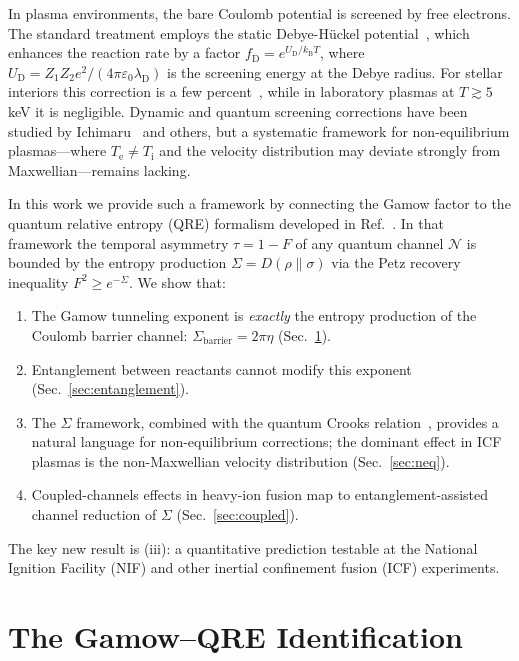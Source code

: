 \documentclass[prc,twocolumn,superscriptaddress,longbibliography,floatfix]{revtex4-2}
\newcommand{\kB}{k_{\mathrm{B}}}
\newcommand{\chan}{\mathcal{N}}
\newcommand{\tauasym}{\tau}
\newcommand{\Sbar}{\Sigma_{\mathrm{barrier}}}
\newcommand{\lD}{\lambda_{\mathrm{D}}}
\newcommand{\UD}{U_{\mathrm{D}}}
\newcommand{\fD}{f_{\mathrm{D}}}
\newcommand{\Te}{T_{\mathrm{e}}}
\newcommand{\Ti}{T_{\mathrm{i}}}
\begin{document}
In plasma environments, the bare Coulomb potential is screened by free
electrons.  The standard treatment employs the static Debye-H\"uckel
potential~\cite{Salpeter1954}, which enhances the reaction rate by a
factor $\fD = e^{\UD/\kB T}$, where $\UD = Z_{1}Z_{2}e^{2}/(4\pi\varepsilon_{0}\lD)$
is the screening energy at the Debye radius.  For stellar interiors this
correction is a few percent~\cite{Salpeter1954,Dewitt1973}, while in
laboratory plasmas at $T \gtrsim 5\,$keV it is negligible.  Dynamic and
quantum screening corrections have been studied by
Ichimaru~\cite{Ichimaru1993} and others, but a systematic framework for
non-equilibrium plasmas---where $\Te \neq \Ti$ and the velocity
distribution may deviate strongly from Maxwellian---remains lacking.

In this work we provide such a framework by connecting the Gamow factor
to the quantum relative entropy (QRE) formalism developed in
Ref.~\cite{Huang2026}.  In that framework the temporal asymmetry
$\tauasym = 1 - F$ of any quantum channel $\chan$ is bounded by the
entropy production $\Sigma = D(\rho \| \sigma)$ via the Petz recovery
inequality $F^{2} \geq e^{-\Sigma}$.  We show that:
\begin{enumerate}
\item The Gamow tunneling exponent is \emph{exactly} the entropy
  production of the Coulomb barrier channel:
  $\Sbar = 2\pi\eta$ (Sec.~\ref{sec:gamow_qre}).
\item Entanglement between reactants cannot modify this exponent
  (Sec.~\ref{sec:entanglement}).
\item The $\Sigma$ framework, combined with the quantum Crooks
  relation~\cite{Crooks1999,JRSWW2018}, provides a natural language for
  non-equilibrium corrections; the dominant effect in ICF plasmas is the
  non-Maxwellian velocity distribution (Sec.~\ref{sec:neq}).
\item Coupled-channels effects in heavy-ion fusion map to
  entanglement-assisted channel reduction of $\Sigma$
  (Sec.~\ref{sec:coupled}).
\end{enumerate}
The key new result is (iii): a quantitative prediction testable at
the National Ignition Facility (NIF) and other inertial confinement
fusion (ICF) experiments.

\section{The Gamow--QRE Identification}
\label{sec:gamow_qre}
\end{document}
